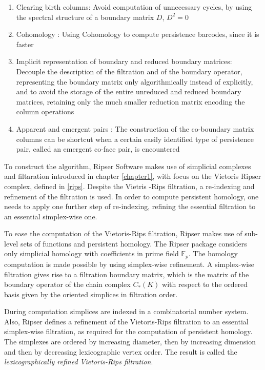 \documentclass[11pt,a4paper]{report}
\begin{document}
            \begin{enumerate}
             \item Clearing birth columns:
             Avoid computation of unnecessary cycles, by using the spectral structure of a boundary matrix $D$, $D^2 = 0$
             \item Cohomology :
             Using Cohomology to compute persistence barcodes, since it is faster
             \item Implicit representation of boundary and reduced boundary matrices:
              Decouple the description of the filtration and of the boundary operator, representing the boundary matrix only algorithmically
                instead of explicitly, and to avoid the storage of the entire unreduced and reduced boundary matrices, retaining
                only the much smaller reduction matrix encoding the column operations
            \item Apparent and emergent pairs :
            The construction of the co-boundary matrix columns can be shortcut when a
            certain easily identified type of persistence pair, called an emergent co-face pair, is encountered
            \end{enumerate}

            To construct the algorithm, Ripser Software makes use of simplicial complexes and filtaration introduced in chapter \ref{chapter1}, with focus on the Vietoris Ripser complex, defined in \ref{rips}. Despite the Vietris -Rips filtration, a re-indexing and refinement of the filtration is used. In order to compute persistent homology, one needs to apply one further step of
            re-indexing, refining the essential filtration to an essential simplex-wise one.

            To ease the computation of the Vietoris-Rips filtration, Ripser makes use of sub-level sets of functions and persistent homology. The Ripser package considers only simplicial homology with
            coefficients in prime field $\mathbb{F}_p$. The homology computation is made possible by using simplex-wise refinement. A simplex-wise filtration gives rise to a filtration boundary matrix,
            which is the matrix of the boundary operator of the chain complex $C_*(K)$ with respect to the ordered basis given by the oriented simplices in filtration order.

            During computation simplices are indexed in a combinatorial number system. Also, Ripser defines a refinement of the Vietoris-Rips filtration to an essential simplex-wise filtration, as required for the computation of persistent homology. The simplexes are ordered by increasing diameter, then by increasing dimension and then by decreasing lexicographic vertex order. The result is called the
            \emph{lexicographically refined Vietoris-Rips filtration}.
\end{document}
